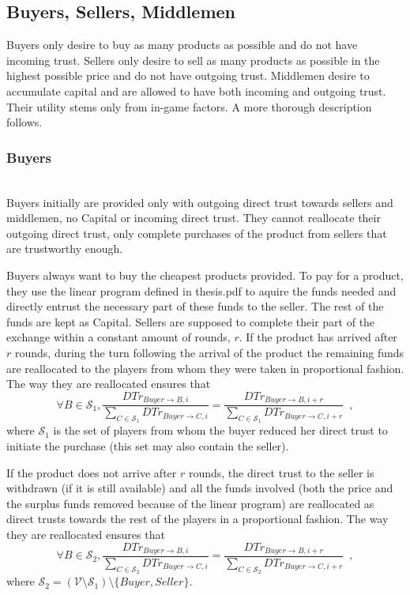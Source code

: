 \subsection{Buyers, Sellers, Middlemen}
  Buyers only desire to buy as many products as possible and do not have incoming trust. Sellers only desire to sell as many
  products as possible in the highest possible price and do not have outgoing trust. Middlemen desire to accumulate capital
  and are allowed to have both incoming and outgoing trust. Their utility stems only from in-game factors. A more thorough
  description follows.

  \subsubsection{Buyers} \ \\

    Buyers initially are provided only with outgoing direct trust towards sellers and middlemen, no Capital or incoming direct
    trust. They cannot reallocate their outgoing direct trust, only complete purchases of the product from sellers that are
    trustworthy enough.
    
    Buyers always want to buy the cheapest products provided. To pay for a product, they use the linear program defined in
    thesis.pdf to aquire the funds needed and directly entrust the necessary part of these funds to the seller. The rest of
    the funds are kept as Capital. Sellers are supposed to complete their part of the exchange within a constant amount of
    rounds, $r$. If the product has arrived after $r$ rounds, during the turn following the arrival of the product the
    remaining funds are reallocated to the players from whom they were taken in proportional fashion. The way they are
    reallocated ensures that
    \begin{equation*}
      \forall B \in \mathcal{S}_1, \frac{DTr_{Buyer \rightarrow B, i}}{\sum\limits_{C \in \mathcal{S}_1}DTr_{Buyer \rightarrow
      C, i}} = \frac{DTr_{Buyer \rightarrow B, i + r}}{\sum\limits_{C \in \mathcal{S}_1}DTr_{Buyer \rightarrow C, i + r}}
      \enspace,
    \end{equation*}
    where $\mathcal{S}_1$ is the set of players from whom the buyer reduced her direct trust to initiate the purchase (this
    set may also contain the seller).

    If the product does not arrive after $r$ rounds, the direct trust to the seller is withdrawn (if it is still available)
    and all the funds involved (both the price and the surplus funds removed because of the linear program) are reallocated as
    direct trusts towards the rest of the players in a proportional fashion. The way they are reallocated ensures that
    \begin{equation*}
      \forall B \in \mathcal{S}_2, \frac{DTr_{Buyer \rightarrow B, i}}{\sum\limits_{C \in \mathcal{S}_2}DTr_{Buyer \rightarrow
      C, i}} = \frac{DTr_{Buyer \rightarrow B, i + r}}{\sum\limits_{C \in \mathcal{S}_2}DTr_{Buyer \rightarrow C, i + r}}
      \enspace,
    \end{equation*}
    where $\mathcal{S}_2 = \left(\mathcal{V} \setminus \mathcal{S}_1\right) \setminus{\{Buyer, Seller\}}$.

